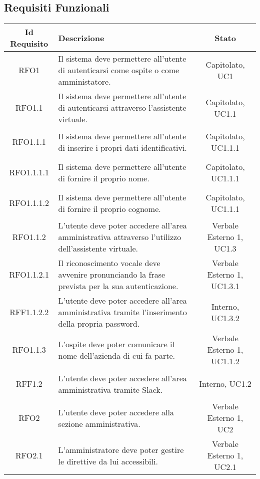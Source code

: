 \subsection{Requisiti Funzionali}
\normalsize
\begin{longtable}{|c|>{\centering}m{7cm}|c|}
\hline
\textbf{Id Requisito} & \textbf{Descrizione} & \textbf{Stato}\\
\hline
\endhead\hypertarget{RFO1}{RFO1} & Il sistema deve permettere all'utente di autenticarsi come ospite o come amministatore. & Capitolato, UC1\\ \hline
\hypertarget{RFO1.1}{RFO1.1} & Il sistema deve permettere all'utente di autenticarsi attraverso l'assistente virtuale. & Capitolato, UC1.1\\ \hline
\hypertarget{RFO1.1.1}{RFO1.1.1} & Il sistema deve permettere all'utente di inserire i propri dati identificativi. & Capitolato, UC1.1.1\\ \hline
\hypertarget{RFO1.1.1.1}{RFO1.1.1.1} & Il sistema deve permettere all'utente di fornire il proprio nome. & Capitolato, UC1.1.1\\ \hline
\hypertarget{RFO1.1.1.2}{RFO1.1.1.2} & Il sistema deve permettere all'utente di fornire il proprio cognome. & Capitolato, UC1.1.1\\ \hline
\hypertarget{RFO1.1.2}{RFO1.1.2} & L'utente deve poter accedere all'area amministrativa attraverso l'utilizzo dell'assistente virtuale. & Verbale Esterno 1, UC1.3\\ \hline
\hypertarget{RFO1.1.2.1}{RFO1.1.2.1} & Il riconoscimento vocale deve avvenire pronunciando la frase prevista per la sua autenticazione. & Verbale Esterno 1, UC1.3.1\\ \hline
\hypertarget{RFF1.1.2.2}{RFF1.1.2.2} & L'utente deve poter accedere all'area amministrativa tramite l'inserimento della propria password. & Interno, UC1.3.2\\ \hline
\hypertarget{RFO1.1.3}{RFO1.1.3} & L'ospite deve poter comunicare il nome dell'azienda di cui fa parte. & Verbale Esterno 1, UC1.1.2\\ \hline
\hypertarget{RFF1.2}{RFF1.2} & L'utente deve poter accedere all'area amministrativa tramite Slack. & Interno, UC1.2\\ \hline
\hypertarget{RFO2}{RFO2} & L'utente deve poter accedere alla sezione amministrativa. & Verbale Esterno 1, UC2\\ \hline
\hypertarget{RFO2.1}{RFO2.1} & L'amministratore deve poter gestire le direttive da lui accessibili. & Verbale Esterno 1, UC2.1\\ \hline

\end{longtable}

